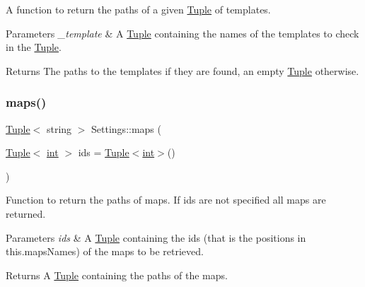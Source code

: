A function to return the paths of a given \mbox{\hyperlink{class_tuple}{Tuple}} of templates. 


\begin{DoxyParams}{Parameters}
{\em \+\_\+template} & A \mbox{\hyperlink{class_tuple}{Tuple}} containing the names of the templates to check in the \mbox{\hyperlink{class_tuple}{Tuple}}. \\
\hline
\end{DoxyParams}
\begin{DoxyReturn}{Returns}
The paths to the templates if they are found, an empty \mbox{\hyperlink{class_tuple}{Tuple}} otherwise. 
\end{DoxyReturn}
\mbox{\label{class_settings_aa924e455cc6ac356ba6a4c59ab09591c}} 
\subsubsection{\texorpdfstring{maps()}{maps()}\hspace{0.1cm}{\footnotesize\ttfamily [1/4]}}
{\footnotesize\ttfamily \mbox{\hyperlink{class_tuple}{Tuple}}$<$ string $>$ Settings\+::maps (\begin{DoxyParamCaption}\item[{\mbox{\hyperlink{class_tuple}{Tuple}}$<$ \mbox{\hyperlink{draw_8hh_aa620a13339ac3a1177c86edc549fda9b}{int}} $>$}]{ids = {\ttfamily \mbox{\hyperlink{class_tuple}{Tuple}}$<$\mbox{\hyperlink{draw_8hh_aa620a13339ac3a1177c86edc549fda9b}{int}}$>$()} }\end{DoxyParamCaption})}



Function to return the paths of maps. If ids are not specified all maps are returned. 


\begin{DoxyParams}{Parameters}
{\em ids} & A \mbox{\hyperlink{class_tuple}{Tuple}} containing the ids (that is the positions in this.\+maps\+Names) of the maps to be retrieved. \\
\hline
\end{DoxyParams}
\begin{DoxyReturn}{Returns}
A \mbox{\hyperlink{class_tuple}{Tuple}} containing the paths of the maps. 
\end{DoxyReturn}
\mbox{\label{class_settings_adc050f187f4040f5e897b2ff41caedd0}} 
